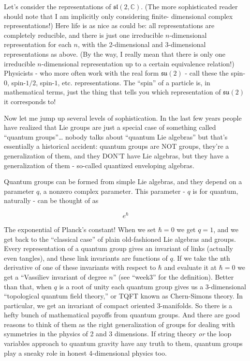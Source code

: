\documentclass{article}
\begin{document}
Let's consider the representations of \(\mathfrak{sl}(2,\mathbb{C})\).
(The more sophisticated reader should note that I am implicitly only
considering finite- dimensional complex representations!) Here life is
as nice as could be: all representations are completely reducible, and
there is just one irreducible \(n\)-dimensional representation for each
\(n\), with the 2-dimensional and 3-dimensional representations as
above. (By the way, I really mean that there is only one irreducible
\(n\)-dimensional representation up to a certain equivalence relation!)
Physicists - who more often work with the real form \(\mathfrak{su}(2)\)
- call these the spin-\(0\), spin-\(1/2\), spin-\(1\), etc.
representations. The ``spin'' of a particle is, in mathematical terms,
just the thing that tells you which representation of
\(\mathfrak{su}(2)\) it corresponds to!

Now let me jump up several levels of sophistication. In the last few
years people have realized that Lie groups are just a special case of
something called ``quantum groups''\ldots{} nobody talks about ``quantum
Lie algebras'' but that's essentially a historical accident: quantum
groups are NOT groups, they're a generalization of them, and they DON'T
have Lie algebras, but they have a generalization of them - so-called
quantized enveloping algebras.

Quantum groups can be formed from simple Lie algebras, and they depend
on a parameter \(q\), a nonzero complex parameter. This parameter -
\(q\) is for quantum, naturally - can be thought of as

\[e^\hbar\]

The exponential of Planck's constant! When we set \(\hbar = 0\) we get
\(q = 1\), and we get back to the ``classical case'' of plain
old-fashioned Lie algebras and groups. Every representation of a quantum
group gives an invariant of links (actually even tangles), and these
link invariants are functions of \(q\). If we take the nth derivative of
one of these invariants with respect to \(\hbar\) and evaluate it at
\(\hbar = 0\) we get a ``Vassiliev invariant of degree \(n\)'' (see
``week3'' for the definition). Better than that, when \(q\) is a root of
unity each quantum group gives us a 3-dimensional ``topological quantum
field theory,'' or TQFT known as Chern-Simons theory. In particular, we
get an invariant of compact oriented 3-manifolds. So there is a hefty
bunch of mathematical payoffs from quantum groups. And there are good
reasons to think of them as the right generalization of groups for
dealing with symmetries in the physics of 2 and 3 dimensions. If string
theory \emph{or} the loop variables approach to quantum gravity have any
truth to them, quantum groups play a sneaky role in honest 4-dimensional
physics too.
\end{document}
